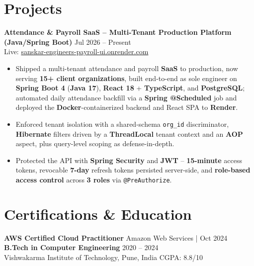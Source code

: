 \documentclass[a4paper,10pt]{article}
\begin{document}
\section*{Projects}

\textbf{Attendance \& Payroll SaaS -- Multi-Tenant Production Platform (Java/Spring Boot)} \hfill Jul 2026 -- Present \\
Live: \href{https://sanskar-engineers-payroll-ui.onrender.com/login}{sanskar-engineers-payroll-ui.onrender.com}
\begin{itemize}[leftmargin=*]
    \item Shipped a multi-tenant attendance and payroll \textbf{SaaS} to production, now serving \textbf{15+ client organizations}, built end-to-end as sole engineer on \textbf{Spring Boot 4} (\textbf{Java 17}), \textbf{React 18} + \textbf{TypeScript}, and \textbf{PostgreSQL}; automated daily attendance backfill via a \textbf{Spring @Scheduled} job and deployed the \textbf{Docker}-containerized backend and React SPA to \textbf{Render}.
    \item Enforced tenant isolation with a shared-schema \texttt{org\_id} discriminator, \textbf{Hibernate} filters driven by a \textbf{ThreadLocal} tenant context and an \textbf{AOP} aspect, plus query-level scoping as defense-in-depth.
    \item Protected the API with \textbf{Spring Security} and \textbf{JWT} -- \textbf{15-minute} access tokens, revocable \textbf{7-day} refresh tokens persisted server-side, and \textbf{role-based access control} across \textbf{3 roles} via \texttt{@PreAuthorize}.
\end{itemize}

\section*{Certifications \& Education}
\textbf{AWS Certified Cloud Practitioner} \hfill Amazon Web Services \;|\; Oct 2024 \\
\textbf{B.Tech in Computer Engineering} \hfill 2020 -- 2024 \\
Vishwakarma Institute of Technology, Pune, India \hfill CGPA: 8.8/10
\end{document}
